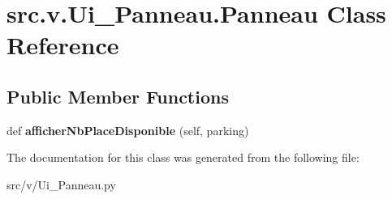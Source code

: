 \hypertarget{classsrc_1_1v_1_1_ui___panneau_1_1_panneau}{}\section{src.\+v.\+Ui\+\_\+\+Panneau.\+Panneau Class Reference}
\label{classsrc_1_1v_1_1_ui___panneau_1_1_panneau}
\subsection*{Public Member Functions}
\begin{DoxyCompactItemize}
\item 
\hypertarget{classsrc_1_1v_1_1_ui___panneau_1_1_panneau_a5fb78e3d4ac1983e447ab5a1a9c11667}{}def {\bfseries afficher\+Nb\+Place\+Disponible} (self, parking)\label{classsrc_1_1v_1_1_ui___panneau_1_1_panneau_a5fb78e3d4ac1983e447ab5a1a9c11667}

\end{DoxyCompactItemize}


The documentation for this class was generated from the following file\+:\begin{DoxyCompactItemize}
\item 
src/v/Ui\+\_\+\+Panneau.\+py\end{DoxyCompactItemize}

